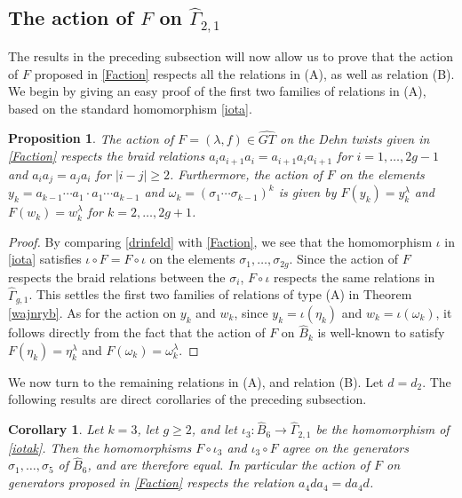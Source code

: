 \documentclass[a4paper,10pt,reqno]{amsart}
\newcommand\GT{\widehat{GT}}
\newcommand\B{\widehat{B}}
\newcommand\GGone{\widehat{\Gamma}_{g,1}}
\newtheorem{cor}[thm]{Corollary}
\newtheorem{prop}[thm]{Proposition}
\begin{document}
\subsection{The action of $F$ on $\widehat\Gamma_{2,1}$}

The results in the preceding subsection will now allow us to prove that the
action of $F$ proposed in \eqref{Faction} respects all the relations in (A), as well as relation (B).
We begin by giving an easy proof of the first two families of relations in (A), based on
the standard homomorphism \eqref{iota}.

\begin{prop}\label{braidrels} 
The action of $F=(\lambda,f)\in \GT$ on
the Dehn twists given in \eqref{Faction} respects the braid relations
$a_ia_{i+1}a_i=a_{i+1}a_ia_{i+1}$ for $i=1,\ldots,2g-1$ and
$a_ia_j=a_ja_i$ for $|i-j|\ge 2$. Furthermore, the action of $F$ on the
elements $y_k=a_{k-1}\cdots a_1\cdot a_1\cdots a_{k-1}$ and $\omega_k=(\sigma_1\cdots\sigma_{k-1})^k$
is given by $F(y_k)=y_k^\lambda$ and $F(w_k)=w_k^\lambda$ for $k=2,\ldots,2g+1$.
\end{prop}

\begin{proof}
By comparing \eqref{drinfeld} with \eqref{Faction}, we
see that the homomorphism $\iota$ in \eqref{iota} satisfies
$\iota\circ F=F\circ \iota$ on the elements $\sigma_1,\ldots,\sigma_{2g}$.
Since the action of $F$ respects the braid relations between the $\sigma_i$,
$F\circ\iota$ respects the same relations in $\GGone$. This settles the first
two families of relations of type (A) in Theorem \ref{wajnryb}. As for the action on
$y_k$ and $w_k$, since $y_k=\iota(\eta_k)$ and $w_k=\iota(\omega_k)$, it follows 
directly from the fact that the action of $F$ on $\B_k$
is well-known to satisfy $F(\eta_k)=\eta_k^\lambda$ and $F(\omega_k)=\omega_k^\lambda$.
\end{proof}

\vspace{.3cm}
We now turn to the remaining relations in (A), and relation (B). Let $d=d_2$. 
The following results are direct corollaries of the preceding subsection.

\begin{cor}\label{Fiotacommute} Let $k=3$, let $g\ge 2$, and let 
$\iota_3:\B_6\rightarrow \widehat\Gamma_{2,1}$ be the homomorphism of \eqref{iotak}.
Then the homomorphisms $F\circ\iota_3$ and $\iota_3\circ F$ agree on the
generators $\sigma_1,\ldots,\sigma_5$ of $\B_6$, and are therefore
equal. In particular the 
action of $F$ on generators proposed in \eqref{Faction} respects the
relation $a_4da_4=da_4d$.
\end{cor}
\end{document}
